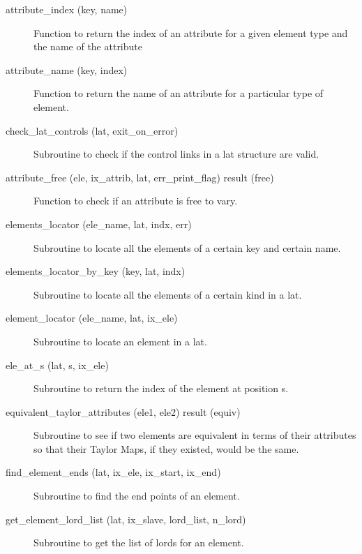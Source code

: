 \begin{description}

\item[attribute_index (key, name)] \Newline
Function to return the index of an attribute for a given element 
type and the name of the attribute 

\item[attribute_name (key, index)] \Newline
Function to return the name of an attribute for a particular type of element. 

\item[check_lat_controls (lat, exit_on_error)] \Newline
Subroutine to check if the control links in a lat structure are valid. 

\item[attribute_free (ele, ix_attrib, lat, err_print_flag) result (free)] \Newline
Function to check if an attribute is free to vary.

\item[elements_locator (ele_name, lat, indx, err)] \Newline 
Subroutine to locate all the elements of a certain key 
and certain name. 

\item[elements_locator_by_key (key, lat, indx)] \Newline
Subroutine to locate all the elements of a certain kind in a lat. 

\item[element_locator (ele_name, lat, ix_ele)] \Newline
Subroutine to locate an element in a lat. 

\item[ele_at_s (lat, s, ix_ele)] \Newline 
Subroutine to return the index of the element at position s.

\item[equivalent_taylor_attributes (ele1, ele2) result (equiv)] \Newline 
Subroutine to see if two elements are equivalent in terms of their attributes so
that their Taylor Maps, if they existed, would be the same.

\item[find_element_ends (lat, ix_ele, ix_start, ix_end)] \Newline
Subroutine to find the end points of an element. 

\item[get_element_lord_list (lat, ix_slave, lord_list, n_lord)] \Newline 
Subroutine to get the list of lords for an element.


\end{description}
